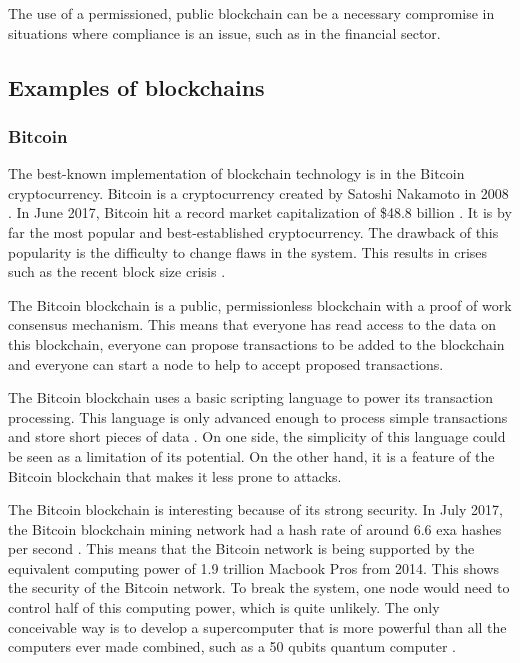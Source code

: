 The use of a permissioned, public blockchain can be a necessary compromise in situations where compliance is an issue, such as in the financial sector.


\subsection{Examples of blockchains}

\subsubsection{Bitcoin}


The best-known implementation of blockchain technology is in the Bitcoin cryptocurrency. Bitcoin is a cryptocurrency created by Satoshi Nakamoto in 2008 \cite{Bitcoin-paper}. In June 2017, Bitcoin hit a record market capitalization of \$48.8 billion \cite{Bitcoin-market-cap}. It is by far the most popular and best-established cryptocurrency. The drawback of this popularity is the difficulty to change flaws in the system. This results in crises such as the recent block size crisis \cite{Bitcoin-civil-war}.

The Bitcoin blockchain is a public, permissionless blockchain with a proof of work consensus mechanism. This means that everyone has read access to the data on this blockchain, everyone can propose transactions to be added to the blockchain and everyone can start a node to help to accept proposed transactions.

The Bitcoin blockchain uses a basic scripting language to power its transaction processing. This language is only advanced enough to process simple transactions and store short pieces of data \cite{antonopoulos:2014}. On one side, the simplicity of this language could be seen as a limitation of its potential. On the other hand, it is a feature of the Bitcoin blockchain that makes it less prone to attacks.

The Bitcoin blockchain is interesting because of its strong security. In July 2017, the Bitcoin blockchain mining network had a hash rate of around 6.6 exa hashes per second \cite{Bitcoin-hash-rate}. This means that the Bitcoin network is being supported by the equivalent computing power of 1.9 trillion Macbook Pros from 2014. This shows the security of the Bitcoin network. To break the system, one node would need to control half of this computing power, which is quite unlikely. The only conceivable way is to develop a supercomputer that is more powerful than all the computers ever made combined, such as a 50 qubits quantum computer \cite{quantum-newsweek}.

